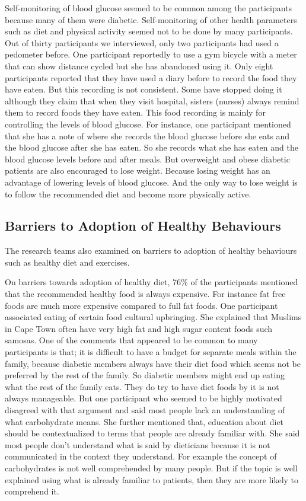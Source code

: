 Self-monitoring of blood glucose seemed to be common among the participants because many of them were diabetic. Self-monitoring of other health parameters such as diet and physical activity seemed not to be done by many participants. Out of thirty participants we interviewed, only two participants had used a pedometer before.  One participant reportedly to use a gym bicycle with a meter that can show distance cycled but she has abandoned using it. Only eight participants reported that they have used a diary before to record the food they have eaten. But this recording is not consistent. Some have stopped doing it although they claim that when they visit hospital, sisters (nurses) always remind them to record foods they have eaten. This food recording is mainly for controlling the levels of blood glucose. For instance, one participant mentioned that she has a note of where she records the blood glucose before she eats and the blood glucose after she has eaten. So she records what she has eaten and the blood glucose levels before and after meals. But overweight and obese diabetic patients are also encouraged to lose weight. Because losing weight has an advantage of lowering levels of blood glucose.  And the only way to lose weight is to follow the recommended diet and become more physically active. 
\subsection{Barriers to Adoption of Healthy Behaviours}
The research teams also examined on barriers to adoption of healthy behaviours such as healthy diet and exercises.

On barriers towards adoption of healthy diet, 76\% of the participants mentioned that the recommended healthy food is always expensive. For instance fat free foods are much more expensive compared to full fat foods. One participant associated eating of certain food cultural upbringing. She explained that Muslims in Cape Town often have very high fat and high sugar content foods  such samosas. One of the comments that appeared to be common to many participants is that; it is difficult to have a budget for separate meals within the family, because diabetic members always have their diet food which seems not be preferred by the rest of the family. So diabetic members might end up eating what the rest of the family eats. They do try to have diet foods by it is not always manageable. But one participant who seemed to be highly motivated disagreed with that argument and said most people lack an understanding of what carbohydrate means. She further mentioned that, education about diet should be contextualized to terms that people are already familiar with. She said most people don't understand what is said by dieticians because it is not communicated in the context they understand. For example the concept of carbohydrates is not well comprehended by many people. But if the topic is well explained using what is already familiar to patients, then they are more likely to comprehend it.


